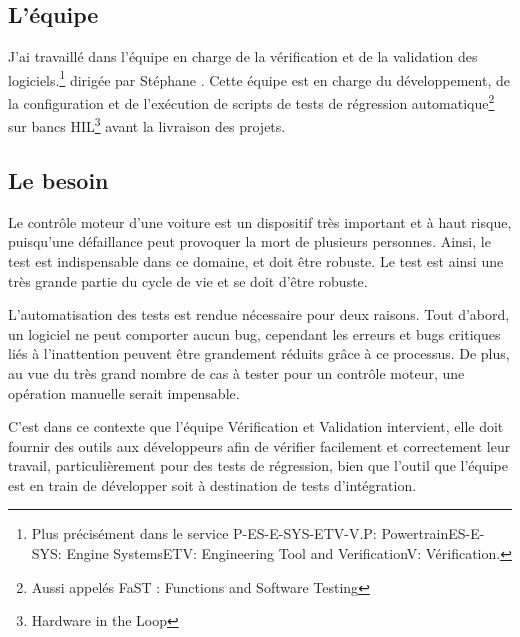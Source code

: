 		\subsection{L'équipe}
		J'ai travaillé dans l'équipe en charge de la vérification et de la validation des logiciels.\footnote{Plus précisément dans le service P-ES-E-SYS-ETV-V.\newline P: Powertrain\newline ES-E-SYS: Engine Systems\newline ETV: Engineering Tool and Verification\newline V: Vérification.} dirigée par Stéphane . Cette équipe est en charge du développement, de la configuration et de l'exécution de scripts de tests de régression automatique\footnote{Aussi appelés FaST : Functions and Software Testing} sur bancs HIL\footnote{Hardware in the Loop} avant la livraison des projets.
		
		\subsection{Le besoin} \label{besoinTests}
		Le contrôle moteur d'une voiture est un dispositif très important et à haut risque, puisqu'une défaillance peut provoquer la mort de plusieurs personnes. Ainsi, le test est indispensable dans ce domaine, et doit être robuste. Le test est ainsi une très grande partie du cycle de vie et se doit d'être robuste.

L'automatisation des tests est rendue nécessaire pour deux raisons. Tout d'abord, un logiciel ne peut comporter aucun bug, cependant les erreurs et bugs critiques liés à l'inattention peuvent être grandement réduits grâce à ce processus. De plus, au vue du très grand nombre de cas à tester pour un contrôle moteur, une opération manuelle serait impensable. 

C'est dans ce contexte que l'équipe Vérification et Validation intervient, elle doit fournir des outils aux développeurs afin de vérifier facilement et correctement leur travail, particulièrement pour des tests de régression, bien que l'outil que l'équipe est en train de développer soit à destination de tests d'intégration.
